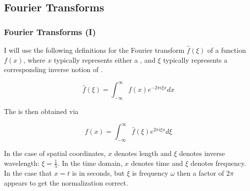 \documentclass[hyperref={colorlinks=true}]{beamer}
\begin{document}
\subsection[Fourier Transforms]{Fourier Transforms}

\begin{frame}%
  \frametitle{Fourier Transforms (I)}

  I will use the following definitions for the Fourier transform $\hat{f}(\xi)$ of a function $f(x)$, where $x$ typically represents either a , and $\xi$ typically represents a corresponding inverse notion of .

  \begin{equation}
    \hat{f}(\xi)=\int_{-\infty}^{\infty} f(x) e^{-2\pi i \xi x } dx
  \end{equation}
  
  The  is then obtained via
  
  \begin{equation}
    f(x)=\int_{-\infty}^{\infty} \hat{f}(\xi) e^{2\pi i \xi x } d\xi 
  \end{equation}

  In the case of spatial coordinates, $x$ denotes length and $\xi$ denotes inverse wavelength: $\xi = \frac{1}{\lambda}$. In the time domain, $x$ denotes time and $\xi$ denotes frequency. In the case that $x=t$ is in seconds, but $\xi$ is  frequency $\omega$ then a factor of $2\pi$ appears to get the normalization correct.

\end{frame}

\end{document}
